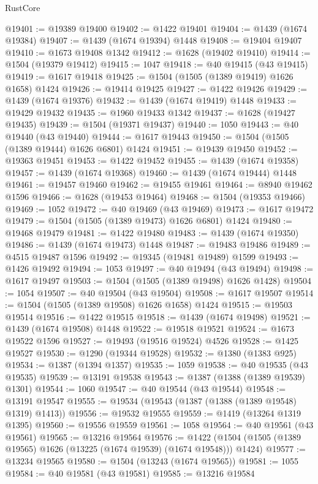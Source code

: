 \begin{lexlean}{RustCore}
\begin{coremodule}
@19401 := @19389 @19400
@19402 := @1422 @19401
@19404 := @1439 (@1674 @19384)
@19407 := @1439 (@1674 @19394) @1448
@19408 := @19404 @19407
@19410 := @1673 @19408 @1342
@19412 := @1628 (@19402 @19410)
@19414 := @1504 (@19379 @19412)
@19415 := 1047
@19418 := @40 @19415 (@43 @19415)
@19419 := @1617 @19418
@19425 := @1504 (@1505 (@1389 @19419) @1626 @1658) @1424
@19426 := @19414 @19425
@19427 := @1422 @19426
@19429 := @1439 (@1674 @19376)
@19432 := @1439 (@1674 @19419) @1448
@19433 := @19429 @19432
@19435 := @1960 @19433 @1342
@19437 := @1628 (@19427 @19435)
@19439 := @1504 (@19371 @19437)
@19440 := 1050
@19443 := @40 @19440 (@43 @19440)
@19444 := @1617 @19443
@19450 := @1504 (@1505 (@1389 @19444) @1626 @6801) @1424
@19451 := @19439 @19450
@19452 := @19363 @19451
@19453 := @1422 @19452
@19455 := @1439 (@1674 @19358)
@19457 := @1439 (@1674 @19368)
@19460 := @1439 (@1674 @19444) @1448
@19461 := @19457 @19460
@19462 := @19455 @19461
@19464 := @8940 @19462 @1596
@19466 := @1628 (@19453 @19464)
@19468 := @1504 (@19353 @19466)
@19469 := 1052
@19472 := @40 @19469 (@43 @19469)
@19473 := @1617 @19472
@19479 := @1504 (@1505 (@1389 @19473) @1626 @6801) @1424
@19480 := @19468 @19479
@19481 := @1422 @19480
@19483 := @1439 (@1674 @19350)
@19486 := @1439 (@1674 @19473) @1448
@19487 := @19483 @19486
@19489 := @4515 @19487 @1596
@19492 := @19345 (@19481 @19489) @1599
@19493 := @1426 @19492
@19494 := 1053
@19497 := @40 @19494 (@43 @19494)
@19498 := @1617 @19497
@19503 := @1504 (@1505 (@1389 @19498) @1626 @1428)
@19504 := 1054
@19507 := @40 @19504 (@43 @19504)
@19508 := @1617 @19507
@19514 := @1504 (@1505 (@1389 @19508) @1626 @1658) @1424
@19515 := @19503 @19514
@19516 := @1422 @19515
@19518 := @1439 (@1674 @19498)
@19521 := @1439 (@1674 @19508) @1448
@19522 := @19518 @19521
@19524 := @1673 @19522 @1596
@19527 := @19493 (@19516 @19524) @4526
@19528 := @1425 @19527
@19530 := @1290 (@19344 @19528)
@19532 := @1380 (@1383 @925)
@19534 := @1387 (@1394 @1357)
@19535 := 1059
@19538 := @40 @19535 (@43 @19535)
@19539 := @13191 @19538
@19543 := @1387 (@1388 (@1389 @19539) @1301)
@19544 := 1060
@19547 := @40 @19544 (@43 @19544)
@19548 := @13191 @19547
@19555 := @19534 (@19543 (@1387 (@1388 (@1389 @19548) @1319) @1413))
@19556 := @19532 @19555
@19559 := @1419 (@13264 @1319 @1395)
@19560 := @19556 @19559
@19561 := 1058
@19564 := @40 @19561 (@43 @19561)
@19565 := @13216 @19564
@19576 := @1422 (@1504 (@1505 (@1389 @19565) @1626 (@13225 (@1674 @19539) (@1674 @19548))) @1424)
@19577 := @13234 @19565
@19580 := @1504 (@13243 (@1674 @19565))
@19581 := 1055
@19584 := @40 @19581 (@43 @19581)
@19585 := @13216 @19584

\end{coremodule}
\end{lexlean}
